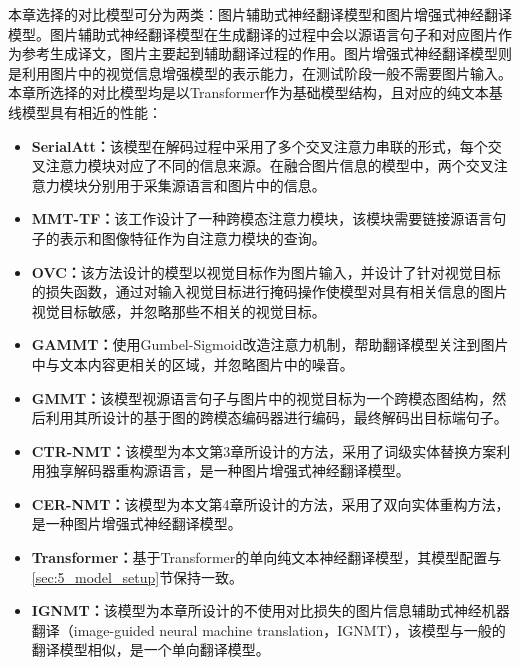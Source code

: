 本章选择的对比模型可分为两类：图片辅助式神经翻译模型和图片增强式神经翻译模型。图片辅助式神经翻译模型在生成翻译的过程中会以源语言句子和对应图片作为参考生成译文，图片主要起到辅助翻译过程的作用。图片增强式神经翻译模型则是利用图片中的视觉信息增强模型的表示能力，在测试阶段一般不需要图片输入。本章所选择的对比模型均是以Transformer作为基础模型结构，且对应的纯文本基线模型具有相近的性能：
\begin{itemize}
    \item \textbf{SerialAtt：}该模型在解码过程中采用了多个交叉注意力串联的形式，每个交叉注意力模块对应了不同的信息来源。在融合图片信息的模型中，两个交叉注意力模块分别用于采集源语言和图片中的信息。
    \item \textbf{MMT-TF：}该工作设计了一种跨模态注意力模块，该模块需要链接源语言句子的表示和图像特征作为自注意力模块的查询。
    \item \textbf{OVC：}该方法设计的模型以视觉目标作为图片输入，并设计了针对视觉目标的损失函数，通过对输入视觉目标进行掩码操作使模型对具有相关信息的图片视觉目标敏感，并忽略那些不相关的视觉目标。
    \item \textbf{GAMMT：}使用Gumbel-Sigmoid改造注意力机制，帮助翻译模型关注到图片中与文本内容更相关的区域，并忽略图片中的噪音。
    \item \textbf{GMMT：}该模型视源语言句子与图片中的视觉目标为一个跨模态图结构，然后利用其所设计的基于图的跨模态编码器进行编码，最终解码出目标端句子。
    \item \textbf{CTR-NMT：}该模型为本文第3章所设计的方法，采用了词级实体替换方案利用独享解码器重构源语言，是一种图片增强式神经翻译模型。
    \item \textbf{CER-NMT：}该模型为本文第4章所设计的方法，采用了双向实体重构方法，是一种图片增强式神经翻译模型。
    \item \textbf{Transformer：}基于Transformer的单向纯文本神经翻译模型，其模型配置与\ref{sec:5_model_setup}节保持一致。
    \item \textbf{IGNMT：}该模型为本章所设计的不使用对比损失的图片信息辅助式神经机器翻译（image-guided neural machine translation，IGNMT），该模型与一般的翻译模型相似，是一个单向翻译模型。
    
\end{itemize}
